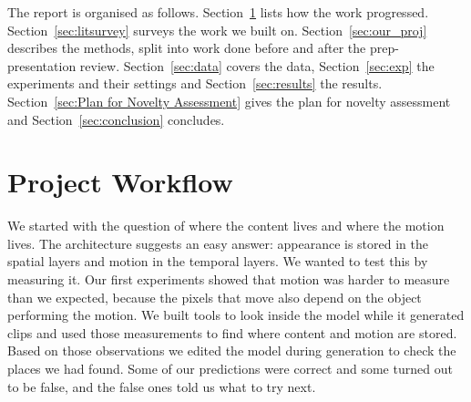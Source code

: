 \documentclass[twoside,english]{article}
\begin{document}
The report is organised as follows. Section~\ref{sec:workflow} lists how the work progressed.
Section~\ref{sec:litsurvey} surveys the work we built on. Section~\ref{sec:our_proj} describes the
methods, split into work done before and after the prep-presentation review.
Section~\ref{sec:data} covers the data, Section~\ref{sec:exp} the experiments and their settings
and Section~\ref{sec:results} the results.
Section~\ref{sec:Plan for Novelty Assessment} gives the plan for novelty assessment and
Section~\ref{sec:conclusion} concludes.

\section{Project Workflow} \label{sec:workflow}

We started with the question of where the content lives and where the motion lives. The
architecture suggests an easy answer: appearance is stored in the spatial layers and motion in the
temporal layers. We wanted to test this by measuring it. Our first experiments showed that motion
was harder to measure than we expected, because the pixels that move also depend on the object
performing the motion. We built tools to look inside the model while it generated clips and used
those measurements to find where content and motion are stored. Based on those observations we
edited the model during generation to check the places we had found. Some of our predictions were
correct and some turned out to be false, and the false ones told us what to try next.
\end{document}
